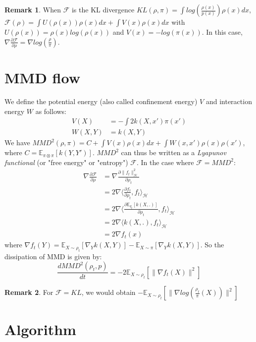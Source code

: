 \documentclass{article}
\newcommand{\1}{\mathbbm 1}
\newcommand{\E}{{{\mathbb E}}}
\newcommand{\kH}{{{\mathcal H}}}
\newcommand{\F}{{{\mathcal F}}}
\theoremstyle{definition}
\newtheorem{remark}{Remark}
\begin{document}
\begin{remark} When $\F$ is the KL divergence $KL(\rho,\pi)=\int log(\frac{\rho(x)}{p(x)})\rho(x)dx$, $\F(\rho)=\int U(\rho(x))\rho(x)dx + \int V(x) \rho(x)dx$ with $U(\rho(x))=\rho(x)log(\rho(x))$ and $V(x)=-log(\pi(x))$. In this case, $\nabla \frac{\partial \F}{\partial \rho}= \nabla log(\frac{\rho}{\pi})$.
\end{remark}

\section{MMD flow}

We define the potential energy (also called confinement energy) $V$ and interaction energy $W$ as follows:
\begin{align}
    V(X)&=-\int 2 k(X,x')\pi(x')\\
    W(X,Y)&=k(X,Y)
\end{align}
We have $MMD^2(\rho,\pi)=C+ \int V(x) \rho(x)dx + \int W(x,x')\rho(x)\rho(x')$, where $C=\E_{\pi\otimes \pi}[k(Y,Y')]$. $MMD^2$ can thus be written as a \textit{Lyapunov functional} (or "free energy" or "entropy") $\F$.
In the case where $\F=MMD^2$:
\begin{align}
        \nabla \frac{\partial \F}{\partial \rho}&= \nabla \frac{\partial \|f_t\|^2_{\kH}}{\partial \rho_t}\\
        &=2 \nabla \langle \frac{\partial f_t}{\partial \rho_t}, f_t \rangle_{\kH}\\
        &=2 \nabla \langle \frac{\partial \E_{q_t}[k(X,.)]}{\partial \rho_t}, f_t \rangle_{\kH}\\
        &=2 \nabla \langle k(X,.), f_t \rangle_{\kH}\\
        &= 2 \nabla f_t(x)
\end{align}
where $\nabla f_t(Y)= \E_{X \sim \rho_t}[\nabla_{Y}k(X,Y)] -  \E_{X \sim \pi}[\nabla_{Y}k(X,Y)]$. So the dissipation of MMD is given by:  
\begin{equation}
    \frac{d MMD^2(\rho_t, p)}{dt}=-2 \E_{X \sim \rho_t}[\|\nabla f_t(X)\|^2]
\end{equation}

\begin{remark}
For $\F=KL$, we would obtain $-\E_{X \sim \rho_t}[\|\nabla log(\frac{\rho_t}{\pi}(X))\|^2]$
\end{remark}



\section{Algorithm}
\end{document}
